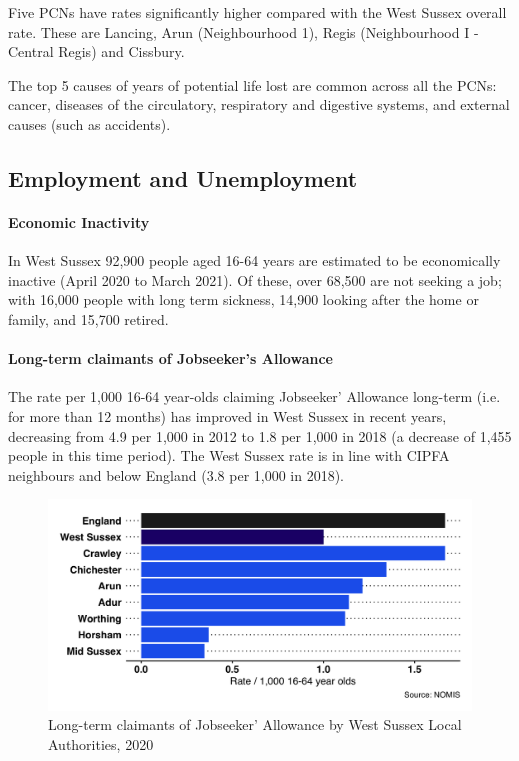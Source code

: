
Five PCNs have rates significantly higher compared with the West Sussex overall rate. These are Lancing, Arun (Neighbourhood 1), Regis (Neighbourhood I - Central Regis) and Cissbury. 

The top 5 causes of years of potential life lost are common across all the PCNs: cancer, diseases of the circulatory, respiratory and digestive systems, and external causes (such as accidents).

\subsection{Employment and Unemployment}
\paragraph{Economic Inactivity}
In West Sussex 92,900 people aged 16-64 years are estimated to be economically inactive (April 2020 to March 2021). Of these, over 68,500 are not seeking a job; with 16,000 people with long term sickness, 14,900 looking after the home or family, and 15,700 retired.

\paragraph{Long-term claimants of Jobseeker's Allowance}

The rate per 1,000 16-64 year-olds claiming Jobseeker' Allowance long-term (i.e. for more than 12 months) has improved in West Sussex in recent years, decreasing from 4.9 per 1,000 in 2012 to 1.8 per 1,000 in 2018 (a decrease of 1,455 people in this time period). The West Sussex rate is in line with CIPFA neighbours and below England (3.8 per 1,000 in 2018).

\begin{figure}[htp]
    \caption{Long-term claimants of Jobseeker' Allowance by West Sussex Local Authorities, 2020}\label{fig:longterm_jsa}
    \centering
	\includegraphics[width=.9\linewidth]{images/longterm_jsa_claimants_wsx.png}
\end{figure}

